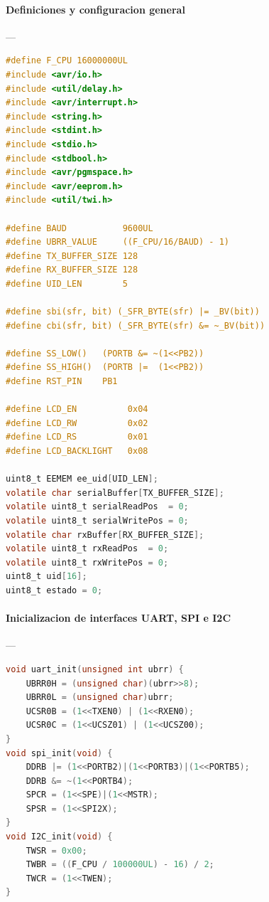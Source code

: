 \paragraph{Definiciones y configuracion general}\label{anexo:C1_definiciones_generales}---\\
\begin{lstlisting}[language=C, caption={Definiciones generales, macros y configuracion inicial del sistema.}]
#define F_CPU 16000000UL
#include <avr/io.h>
#include <util/delay.h>
#include <avr/interrupt.h>
#include <string.h>
#include <stdint.h>
#include <stdio.h>
#include <stdbool.h>
#include <avr/pgmspace.h>
#include <avr/eeprom.h>
#include <util/twi.h>

#define BAUD           9600UL
#define UBRR_VALUE     ((F_CPU/16/BAUD) - 1)
#define TX_BUFFER_SIZE 128
#define RX_BUFFER_SIZE 128
#define UID_LEN        5

#define sbi(sfr, bit) (_SFR_BYTE(sfr) |= _BV(bit))
#define cbi(sfr, bit) (_SFR_BYTE(sfr) &= ~_BV(bit))

#define SS_LOW()   (PORTB &= ~(1<<PB2))
#define SS_HIGH()  (PORTB |=  (1<<PB2))
#define RST_PIN    PB1

#define LCD_EN          0x04
#define LCD_RW          0x02
#define LCD_RS          0x01
#define LCD_BACKLIGHT   0x08

uint8_t EEMEM ee_uid[UID_LEN];
volatile char serialBuffer[TX_BUFFER_SIZE];
volatile uint8_t serialReadPos  = 0;
volatile uint8_t serialWritePos = 0;
volatile char rxBuffer[RX_BUFFER_SIZE];
volatile uint8_t rxReadPos  = 0;
volatile uint8_t rxWritePos = 0;
uint8_t uid[16];
uint8_t estado = 0;
\end{lstlisting}

\paragraph{Inicializacion de interfaces UART, SPI e I2C}\label{anexo:C2_init_interfaces}---\\
\begin{lstlisting}[language=C, caption={Inicializacion de perifericos de comunicacion UART, SPI e I2C.}]
void uart_init(unsigned int ubrr) {
    UBRR0H = (unsigned char)(ubrr>>8);
    UBRR0L = (unsigned char)ubrr;
    UCSR0B = (1<<TXEN0) | (1<<RXEN0);
    UCSR0C = (1<<UCSZ01) | (1<<UCSZ00);
}
void spi_init(void) {
    DDRB |= (1<<PORTB2)|(1<<PORTB3)|(1<<PORTB5);
    DDRB &= ~(1<<PORTB4);
    SPCR = (1<<SPE)|(1<<MSTR);
    SPSR = (1<<SPI2X);
}
void I2C_init(void) {
    TWSR = 0x00;
    TWBR = ((F_CPU / 100000UL) - 16) / 2;
    TWCR = (1<<TWEN);
}
\end{lstlisting}

